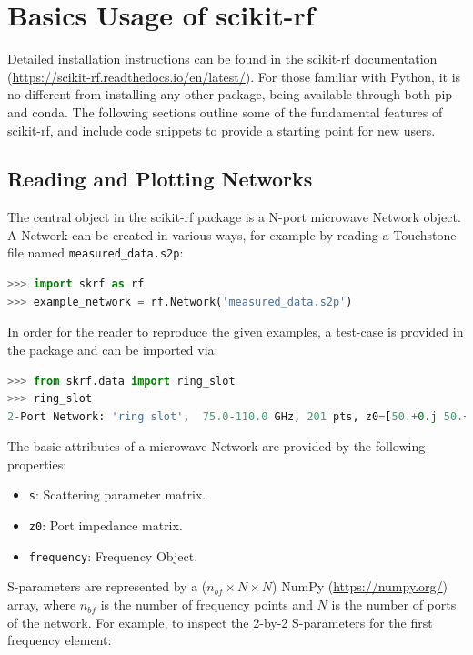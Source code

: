 \documentclass{IEEEjmw}
\begin{document}
\section{Basics Usage of scikit-rf}

Detailed installation instructions can be found in the scikit-rf documentation (\url{https://scikit-rf.readthedocs.io/en/latest/}). For those familiar with Python, it is no different from installing any other package, being available through both pip and conda. The following sections outline some of the fundamental features of scikit-rf, and include code snippets to provide a starting point for new users.

\subsection{Reading and Plotting Networks}


The central object in the scikit-rf package is a N-port microwave Network object. A Network can be created in various ways, for example by reading a Touchstone file named \texttt{measured\_data.s2p}:

\begin{lstlisting}[language=Python]
>>> import skrf as rf
>>> example_network = rf.Network('measured_data.s2p')
\end{lstlisting}

In order for the reader to reproduce the given examples, a test-case is provided in the package and can be imported via:

\begin{lstlisting}[language=Python]
>>> from skrf.data import ring_slot
>>> ring_slot
2-Port Network: 'ring slot',  75.0-110.0 GHz, 201 pts, z0=[50.+0.j 50.+0.j]
\end{lstlisting}


The basic attributes of a microwave Network are provided by the following properties:
\begin{itemize}
\item \texttt{s}: Scattering parameter matrix.
\item \texttt{z0}: Port impedance matrix.
\item \texttt{frequency}: Frequency Object.
\end{itemize}

S-parameters are represented by a ($n_{bf} \times N \times N$) NumPy (\url{https://numpy.org/}) array\cite{harris2020}, where $n_{bf}$ is the number of frequency points and $N$ is the number of ports of the network. For example, to inspect the 2-by-2 S-parameters for the first frequency element:
\end{document}
